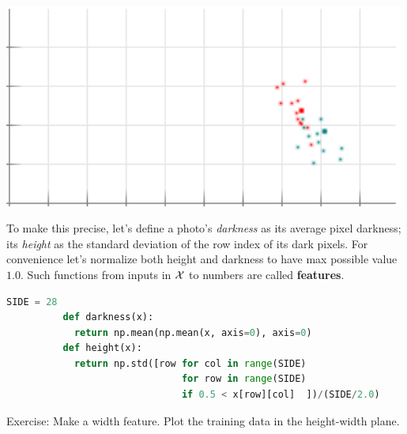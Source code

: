 \documentclass[11pt, justified]{tufte-book}
\newcommand{\attn}[1]{{\bro \textsf{#1}}}
\theoremstyle{definition}
\begin{document}
        \begin{marginfigure}
          \centering
          \includegraphics[width=0.99\textwidth]{example-mnist/train-plain}
            \vspace{-0.25cm}
          \caption{
            Our size-$N=25$ set of training examples, viewed in the
            darkness-height plane.  The vertical \emph{darkness} axis ranges
            $[0.0,0.25]$; the horizontal \emph{height} axis ranges $[0.0,0.5]$.
            The origin is at the lower left.  Each {} dot represents a
            $y={\cya{1}}$ example; each {} dot, a $y={\red{9}}$ one.
            The big ${\red{9}}$ above has darkness and height $(0.118, 0.375)$;\
            the big ${\cya{1}}$, $(0.092, 0.404)$.  See where they are in this
            plot?
          }
        \end{marginfigure}

        To make this precise, let's define a photo's \emph{darkness} as its
        average pixel darkness; its \emph{height} as the standard deviation of
        the row index of its dark pixels.  For convenience let's normalize
        both height and darkness to have max possible value $1.0$.  Such
        functions from inputs in $\mathcal{X}$ to numbers are called
        \textbf{features}.

        \begin{lstlisting}[language=Python, basicstyle=\footnotesize\ttfamily]
          SIDE = 28
          def darkness(x):
            return np.mean(np.mean(x, axis=0), axis=0)
          def height(x):
            return np.std([row for col in range(SIDE)
                               for row in range(SIDE)
                               if 0.5 < x[row][col]  ])/(SIDE/2.0) 
        \end{lstlisting}
        \par\noindent
        \attn{Exercise:} {Make a width feature.  Plot the training data
        in the height-width plane.}
\end{document}
